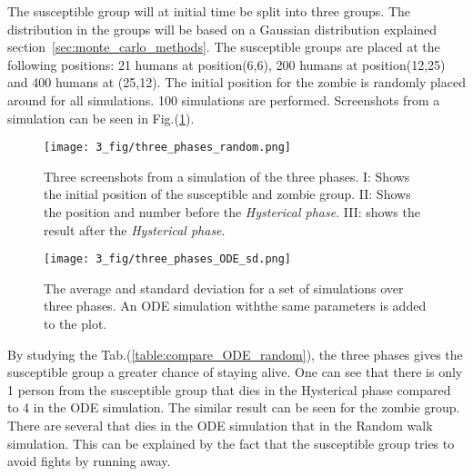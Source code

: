 \documentclass[%
twoside,                 %
final,                   %
chapterprefix=true,      %
open=right               %
10pt]{book}
\begin{document}
\vspace{3mm}




\vspace{3mm}


The susceptible group will at initial time be split into three groups. The distribution in the groups will be based on a Gaussian distribution explained section~\ref{sec:monte_carlo_methods}. The susceptible groups are placed at the following positions: 21 humans at position(6,6), 200 humans at position(12,25) and 400 humans at (25,12). The initial position for the zombie is randomly placed around for all simulations. 100 simulations are performed. Screenshots from a simulation can be seen in Fig.(\ref{fig:screenshots_three_phases}). 


\vspace{3mm}




\vspace{3mm}




\begin{figure}[ht]
  \centerline{\texttt{[image: 3\_fig/three\_phases\_random.png]}}
  \caption{
  \label{fig:screenshots_three_phases} Three screenshots from a simulation of the three phases. I: Shows the initial position of the susceptible and zombie group. II: Shows the position and number before the \emph{Hysterical phase}. III: shows the result after the \emph{Hysterical phase}.
  }
\end{figure}





\begin{figure}[ht]
  \centerline{\texttt{[image: 3\_fig/three\_phases\_ODE\_sd.png]}}
  \caption{
  The average and standard deviation for a set of simulations over three phases. An ODE simulation withthe same parameters is added to the plot.
  }
\end{figure}



By studying the Tab.(\ref{table:compare_ODE_random}), the three phases gives the susceptible group a greater chance of staying alive. One can see that there is only 1 person from the susceptible group that dies in the Hysterical phase compared to 4 in the ODE simulation. The similar result can be seen for the zombie group. There are several that dies in the ODE simulation that in the Random walk simulation. This can be explained by the fact that the susceptible group tries to avoid fights by running away. 
\end{document}
